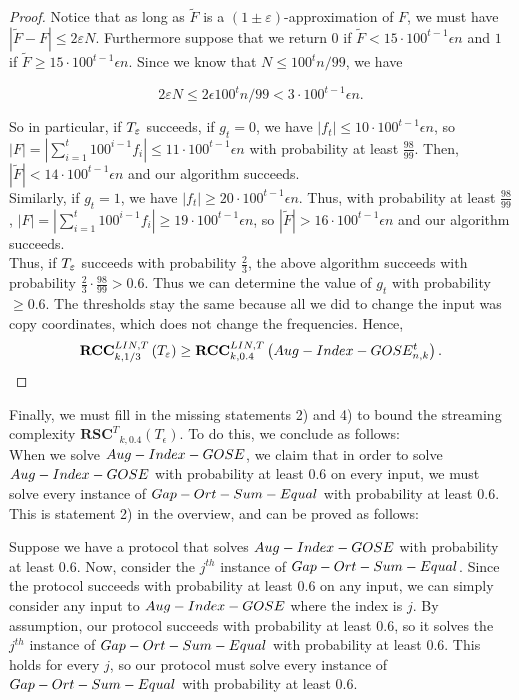 \documentclass[11pt]{article}
\numberwithin{equation}{section}
\theoremstyle{definition}
\theoremstyle{plain}
\newcommand{\gap}{\ensuremath{\varepsilon}}
\newcommand{\rscT}{\ensuremath{\mathbf{RSC}^T}}
\newcommand{\rcclinT}{\ensuremath{\mathbf{RCC}^{LIN,T}}}
\newcommand{\hest}{ \textsc{T} }
\newcommand{\gose}{\textsc{Gap-Ort-Sum-Equal}}
\newcommand{\auggo}{\textsc{Aug-Index-GOSE}}
\begin{document}
\begin{proof}
	Notice that as long as $\widetilde{F}$ is a $(1\pm \gap)$-approximation of $F$, we must have $\left| \widetilde{F} -  F \right| \le 2\gap N$. Furthermore suppose that we return $0$ if $\widetilde{F} < 15 \cdot 100^{t-1}\epsilon n$ and $1$ if $\widetilde{F} \ge 15 \cdot 100^{t-1}\epsilon n$. Since we know that $N \le 100^{t}n/99$, we have
	
	$$2 \gap N \le 2 \epsilon 100^{t}n/99 < 3 \cdot 100^{t-1} \epsilon n.$$
	
	So in particular, if $\hest_\gap$ succeeds, if $g_t = 0$, we have $|f_t| \le 10 \cdot 100^{t-1}\epsilon n$, so $|F| = |\sum_{i=1}^{t}100^{i-1}f_i| \le 11 \cdot 100^{t-1} \epsilon n$ with probability at least $\frac{98}{99}$. Then, $|\tilde{F}| < 14 \cdot 100^{t-1} \epsilon n$ and our algorithm succeeds.\\
	
	Similarly, if $g_t = 1$, we have $|f_t| \ge 20 \cdot 100^{t-1} \epsilon n$. Thus, with probability at least $\frac{98}{99}$, $|F| = |\sum_{i=1}^{t}100^{i-1}f_i| \ge 19 \cdot 100^{t-1} \epsilon n$, so $|\tilde{F}| > 16 \cdot 100^{t-1} \epsilon n$ and our algorithm succeeds.\\
	
	Thus, if $\hest_\gap$ succeeds with probability $\frac{2}{3}$, the above algorithm succeeds with probability $\frac{2}{3} \cdot \frac{98}{99} > 0.6$. Thus we can determine the value of $g_t$ with probability $\ge 0.6$. The thresholds stay the same because all we did to change the input was copy coordinates, which does not change the frequencies. Hence,
	\begin{align}\notag
		\rcclinT_{k,1/3}\left(\hest_\gap \right) 
		\ge \rcclinT_{k,0.4}\left( \auggo_{n,k}^{t} \right).
	\end{align}
\end{proof}	

{\color{black} Finally, we must fill in the missing statements 2) and 4)} to bound the streaming complexity $\rscT_{k,0.4}( T_\epsilon)$. To do this, we conclude as follows:\\
	
	When we solve $\auggo$, we claim that in order to solve $\auggo$ with probability at least $0.6$ on every input, we must solve every instance of $\gose$ with probability at least $0.6$. {\color{black} This is statement 2) in the overview, and can be proved as follows:}
	
	{\color{black}Suppose we have a protocol that solves $\auggo$ with probability at least $0.6$. Now, consider the $j^{th}$ instance of $\gose$. Since the protocol succeeds with probability at least $0.6$ on any input, we can simply consider any input to $\auggo$ where the index is $j$. By assumption, our protocol succeeds with probability at least $0.6$, so it solves the $j^{th}$ instance of $\gose$ with probability at least $0.6$. This holds for every $j$, so our protocol must solve every instance of $\gose$ with probability at least $0.6$.}
	
\end{document}
